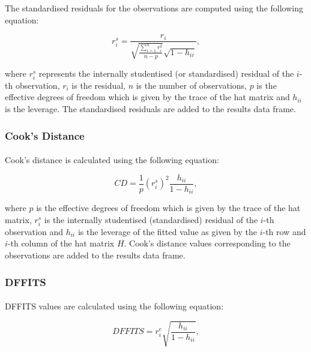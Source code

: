 \documentclass{article}
\begin{document}
The standardised residuals for the observations are computed using the following equation:

\begin{equation}
    r^s_i = \frac{r_i}{\sqrt{\frac{\sum_{i=1}^{n}{r_i^2}}{n-p}}\sqrt{1-h_{ii}}},
\end{equation}

where $r^s_i$ represents the internally studentised (or standardised) residual \parencite[]{residuals} of the $i$-th observation, $r_i$ is the residual, $n$ is the number of observations, $p$ is the effective degrees of freedom which is given by the trace of the hat matrix and $h_{ii}$ is the leverage. The standardised residuals are added to the results data frame. 

\subsubsection{Cook's Distance}
\paragraph{}

Cook's distance \parencite[]{cook} is calculated using the following equation:

\begin{equation}
    CD = \frac{1}{p} (r_i^s)^2 \frac{h_{ii}}{1-h_{ii}},
\end{equation}

where $p$ is the effective degrees of freedom which is given by the trace of the hat matrix, $r^s_i$ is the internally studentised (standardised) residual of the $i$-th observation and $h_{ii}$ is the leverage of the fitted value as given by the $i$-th row and $i$-th column of the hat matrix $H$. Cook's distance values corresponding to the observations are added to the results data frame.

\subsubsection{DFFITS}
\paragraph{}

DFFITS \parencite[]{dffits} values are calculated using the following equation:

\begin{equation}
    DFFITS = r^e_i\sqrt{\frac{h_{ii}}{1-h_{ii}}},
\end{equation}
\end{document}
